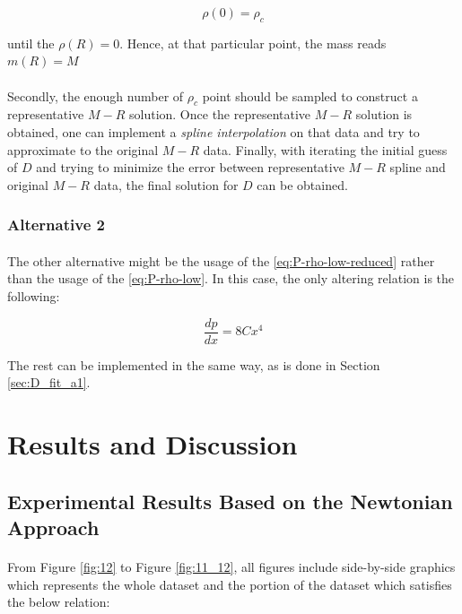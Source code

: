 \documentclass[letterpaper,12pt]{article}
\begin{document}
 \begin{equation*}
     \rho(0) = \rho_c
 \end{equation*}

 until the $\rho(R) = 0$. Hence, at that particular point, the mass reads $m(R) = M$

 \paragraph{} Secondly, the enough number of $\rho_c$ point should be sampled to construct a representative $M-R$ solution. Once the representative $M-R$ solution is obtained, one can implement a \textit{spline interpolation} on that data and try to approximate to the original $M-R$ data. Finally, with iterating the initial guess of $D$ and trying to minimize the error between representative $M-R$ spline and original $M-R$ data, the final solution for $D$ can be obtained.

 \subsubsection{Alternative 2}
 \label{sec:D_fit_a2}

 \paragraph{} The other alternative might be the usage of the \eqref{eq:P-rho-low-reduced} rather than the usage of the \eqref{eq:P-rho-low}. In this case, the only altering relation is the following:

 \begin{equation*}
    \frac{dp}{dx} = 8Cx^4
 \end{equation*}

 The rest can be implemented in the same way, as is done in Section \ref{sec:D_fit_a1}.

\section{Results and Discussion}
\subsection{Experimental Results Based on the Newtonian Approach}

\label{sec:resdis}

\paragraph{} From Figure \ref{fig:12} to Figure \ref{fig:11_12}, all figures include side-by-side graphics which represents the whole dataset and the portion of the dataset which satisfies the below relation:
\end{document}
